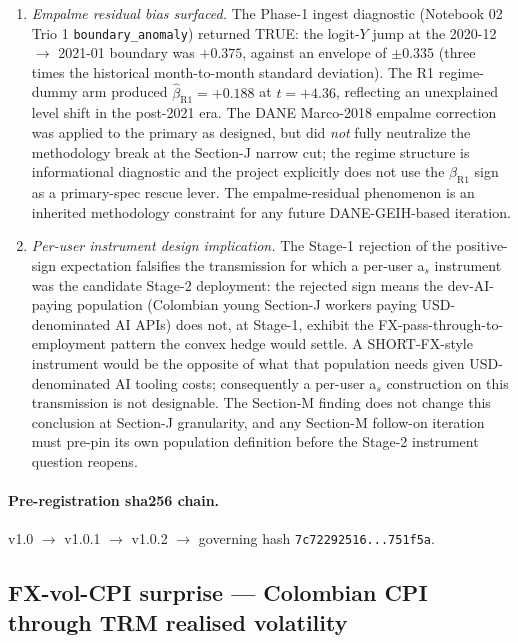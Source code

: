 \begin{enumerate}
    primary, on a fresh spec-pin and the canonical four-row R-arm
    discipline, is the routed-forward path.
  \item \emph{Empalme residual bias surfaced.} The Phase-1 ingest
    diagnostic (Notebook 02 Trio 1 \texttt{boundary\_anomaly}) returned
    TRUE: the logit-\(Y\) jump at the 2020-12 \(\to\) 2021-01 boundary
    was \(+0.375\), against an envelope of \(\pm 0.335\) (three times
    the historical month-to-month standard deviation). The R1
    regime-dummy arm produced \(\hat{\beta}_{\mathrm{R1}} = +0.188\)
    at \(t = +4.36\), reflecting an unexplained level shift in the
    post-2021 era. The DANE Marco-2018 empalme correction was applied
    to the primary as designed, but did \emph{not} fully neutralize the
    methodology break at the Section-J narrow cut; the regime structure
    is informational diagnostic and the project explicitly does not
    use the \(\hat{\beta}_{\mathrm{R1}}\) sign as a primary-spec
    rescue lever. The empalme-residual phenomenon is an inherited
    methodology constraint for any future DANE-GEIH-based iteration.
  \item \emph{Per-user instrument design implication.} The Stage-1
    rejection of the positive-sign expectation falsifies the
    transmission for which a per-user a\(_s\) instrument was the
    candidate Stage-2 deployment: the rejected sign means the dev-AI-
    paying population (Colombian young Section-J workers paying
    USD-denominated AI APIs) does not, at Stage-1, exhibit the
    FX-pass-through-to-employment pattern the convex hedge would
    settle. A SHORT-FX-style instrument would be the opposite of what
    that population needs given USD-denominated AI tooling costs;
    consequently a per-user a\(_s\) construction on this transmission
    is not designable. The Section-M finding does not change this
    conclusion at Section-J granularity, and any Section-M follow-on
    iteration must pre-pin its own population definition before the
    Stage-2 instrument question reopens.
\end{enumerate}

\paragraph{Pre-registration sha256 chain.} v1.0 \(\to\) v1.0.1
\(\to\) v1.0.2 \(\to\) governing hash
\texttt{7c72292516...751f5a}.

\subsection{FX-vol-CPI surprise --- Colombian CPI through TRM realised
volatility}\label{sec:6.3}

